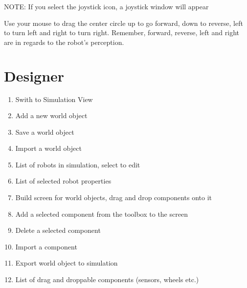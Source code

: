 \documentclass[letterpaper,10pt,english]{sphinxmanual}
\let\sphinxpxdimen\pdfpxdimen\else\newdimen\sphinxpxdimen
\begin{document}
NOTE: If you select the joystick icon, a joystick window will appear

\noindent{\hspace*{\fill}\sphinxincludegraphics[width=125\sphinxpxdimen,height=175\sphinxpxdimen]{{joystick}.png}\hspace*{\fill}}

Use your mouse to drag the center circle up to go forward, down to reverse, left to turn
left and right to turn right. Remember, forward, reverse, left and right are in regards
to the robot’s perception.


\section{Designer}
\label{\detokenize{index:designer}}
\begin{enumerate}
\item {} 
Swith to Simulation View

\item {} 
Add a new world object

\item {} 
Save a world object

\item {} 
Import a world object

\item {} 
List of robots in simulation, select to edit

\item {} 
List of selected robot properties

\item {} 
Build screen for world objects, drag and drop components onto it

\item {} 
Add a selected component from the toolbox to the screen

\item {} 
Delete a selected component

\item {} 
Import a component

\item {} 
Export world object to simulation

\item {} 
List of drag and droppable components (sensors, wheels etc.)

\end{enumerate}
\end{document}
